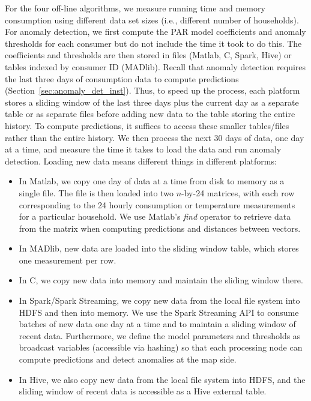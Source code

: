 \documentclass[prodmode,acmtods]{acmsmall}
\begin{document}
For the four off-line algorithms, we measure running time and memory consumption using different data set sizes (i.e., different number of households).  For anomaly detection, we first compute the PAR model coefficients and anomaly thresholds for each consumer but do not include the time it took to do this.  The coefficients and thresholds are then stored in files (Matlab, C, Spark, Hive) or tables indexed by consumer ID (MADlib). Recall that anomaly detection requires the last three days of consumption data to compute predictions (Section~\ref{sec:anomaly_det_inst}).  Thus, to speed up the process, each platform stores a sliding window of the last three days plus the current day as a separate table or as separate files before adding new data to the table storing the entire history.  To compute predictions, it suffices to access these smaller tables/files rather than the entire history.  We then process the next 30 days of data, one day at a time, and measure the time it takes to load the data and run anomaly detection.  Loading new data means different things in different platforms:

\begin{itemize}

\item 
In Matlab, we copy one day of data at a time from disk to memory as a single file.  The file is then loaded into two $n$-by-24 matrices, with each row corresponding to the 24 hourly consumption or temperature measurements for a particular household.  We use Matlab's \emph{find} operator to retrieve data from the matrix when computing predictions and distances between vectors.

\item
In MADlib, new data are loaded into the sliding window table, which stores one measurement per row. 

\item
In C, we copy new data into memory and maintain the sliding window there. 

\item
In Spark/Spark Streaming, we copy new data from the local file system into HDFS and then into memory.  We use the Spark Streaming API to consume batches of new data one day at a time and to maintain a sliding window of recent data.  Furthermore, we define the model parameters and thresholds as broadcast variables (accessible via hashing) so that each processing node can compute predictions and detect anomalies at the map side.

\item
In Hive, we also copy new data from the local file system into HDFS, and the sliding window of recent data is accessible as a Hive external table.

\end{itemize}
\end{document}

